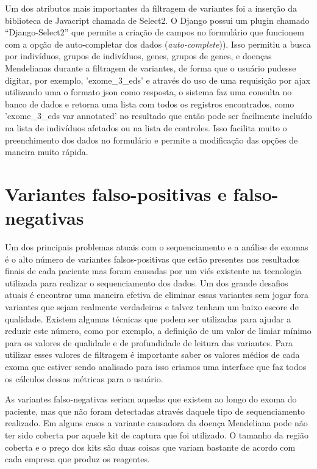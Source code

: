 Um dos atributos mais importantes da filtragem de variantes foi a inserção da biblioteca de Javacript chamada de Select2. O Django possui um plugin chamado ``Django-Select2'' que permite a criação de campos no formulário que funcionem com a opção de auto-completar dos dados (\textit{auto-complete})). Isso permitiu a busca por indivíduos, grupos de indivíduos, genes,  grupos de genes, e doenças Mendelianas durante a filtragem de variantes, de forma que o usuário pudesse digitar, por exemplo, 'exome\_3\_eds' e através do uso de uma requisição por ajax utilizando uma o formato json como resposta, o sistema faz uma consulta no banco de dados e retorna uma lista com todos os registros encontrados, como 'exome\_3\_eds var annotated' no resultado que então pode ser facilmente incluído na lista de indivíduos afetados ou na lista de controles. Isso facilita muito o preenchimento dos dados no formulário e permite a modificação das opções de maneira muito rápida.

\section{Variantes falso-positivas e falso-negativas}

Um dos principais problemas atuais com o sequenciamento e a análise de exomas é o alto número de variantes falsos-positivas que estão presentes nos resultados finais de cada paciente mas foram causadas por um viés existente na tecnologia utilizada para realizar o sequenciamento dos dados. Um dos grande desafios atuais é encontrar uma maneira efetiva de eliminar essas variantes sem jogar fora variantes que sejam realmente verdadeiras e talvez tenham um baixo escore de qualidade. Existem algumas técnicas que podem ser utilizadas para ajudar a reduzir este número, como por exemplo, a definição de um valor de limiar mínimo para os valores de qualidade e de profundidade de leitura das variantes. Para utilizar esses valores de filtragem é importante saber os valores médios de cada exoma que estiver sendo analisado para isso criamos uma interface que faz todos os cálculos dessas métricas para o usuário.

As variantes falso-negativas seriam aquelas que existem ao longo do exoma do paciente, mas que não foram detectadas através daquele tipo de sequenciamento realizado. Em alguns casos a variante causadora da doença Mendeliana pode não ter sido coberta por aquele kit de captura que foi utilizado. O tamanho da região coberta e o preço dos kits são duas coisas que variam bastante de acordo com cada empresa que produz os reagentes.

